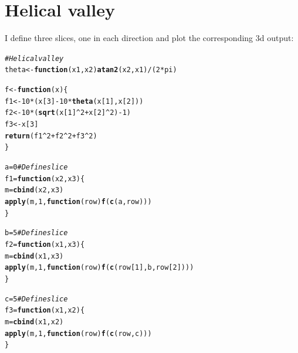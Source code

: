 \documentclass[11pt]{article}\usepackage[]{graphicx}\usepackage[]{color}
\makeatletter
\newcommand{\hlnum}[1]{\textcolor[rgb]{0.686,0.059,0.569}{#1}}%
\newcommand{\hlcom}[1]{\textcolor[rgb]{0.678,0.584,0.686}{\textit{#1}}}%
\newcommand{\hlopt}[1]{\textcolor[rgb]{0,0,0}{#1}}%
\newcommand{\hlstd}[1]{\textcolor[rgb]{0.345,0.345,0.345}{#1}}%
\newcommand{\hlkwa}[1]{\textcolor[rgb]{0.161,0.373,0.58}{\textbf{#1}}}%
\newcommand{\hlkwb}[1]{\textcolor[rgb]{0.69,0.353,0.396}{#1}}%
\newcommand{\hlkwc}[1]{\textcolor[rgb]{0.333,0.667,0.333}{#1}}%
\newcommand{\hlkwd}[1]{\textcolor[rgb]{0.737,0.353,0.396}{\textbf{#1}}}%
\newenvironment{kframe}{%
 \def\at@end@of@kframe{}%
 \ifinner\ifhmode%
  \def\at@end@of@kframe{\end{minipage}}%
  \begin{minipage}{\columnwidth}%
 \fi\fi%
 \def\FrameCommand##1{\hskip\@totalleftmargin \hskip-\fboxsep
 \colorbox{shadecolor}{##1}\hskip-\fboxsep
     \hskip-\linewidth \hskip-\@totalleftmargin \hskip\columnwidth}%
 \MakeFramed {\advance\hsize-\width
   \@totalleftmargin\z@ \linewidth\hsize
   \@setminipage}}%
 {\par\unskip\endMakeFramed%
 \at@end@of@kframe}
\newenvironment{knitrout}{}{} %
\makeatother
\begin{document}
\section{Helical valley}
I define three slices, one in each direction and plot the corresponding 3d output:
\begin{knitrout}
\color{fgcolor}\begin{kframe}
\begin{alltt}
\hlcom{# Helical valley}
\hlstd{theta} \hlkwb{<-} \hlkwa{function}\hlstd{(}\hlkwc{x1}\hlstd{,}\hlkwc{x2}\hlstd{)} \hlkwd{atan2}\hlstd{(x2, x1)}\hlopt{/}\hlstd{(}\hlnum{2}\hlopt{*}\hlstd{pi)}

\hlstd{f} \hlkwb{<-} \hlkwa{function}\hlstd{(}\hlkwc{x}\hlstd{) \{}
  \hlstd{f1} \hlkwb{<-} \hlnum{10}\hlopt{*}\hlstd{(x[}\hlnum{3}\hlstd{]} \hlopt{-} \hlnum{10}\hlopt{*}\hlkwd{theta}\hlstd{(x[}\hlnum{1}\hlstd{],x[}\hlnum{2}\hlstd{]))}
  \hlstd{f2} \hlkwb{<-} \hlnum{10}\hlopt{*}\hlstd{(}\hlkwd{sqrt}\hlstd{(x[}\hlnum{1}\hlstd{]}\hlopt{^}\hlnum{2}\hlopt{+}\hlstd{x[}\hlnum{2}\hlstd{]}\hlopt{^}\hlnum{2}\hlstd{)}\hlopt{-}\hlnum{1}\hlstd{)}
  \hlstd{f3} \hlkwb{<-} \hlstd{x[}\hlnum{3}\hlstd{]}
  \hlkwd{return}\hlstd{(f1}\hlopt{^}\hlnum{2}\hlopt{+}\hlstd{f2}\hlopt{^}\hlnum{2}\hlopt{+}\hlstd{f3}\hlopt{^}\hlnum{2}\hlstd{)}
\hlstd{\}}

\hlstd{a}\hlkwb{=}\hlnum{0} \hlcom{#Define slice}
\hlstd{f1} \hlkwb{=} \hlkwa{function}\hlstd{(}\hlkwc{x2}\hlstd{,}\hlkwc{x3}\hlstd{)\{}
  \hlstd{m}\hlkwb{=}\hlkwd{cbind}\hlstd{(x2,x3)}
  \hlkwd{apply}\hlstd{(m,}\hlnum{1}\hlstd{,}\hlkwa{function}\hlstd{(}\hlkwc{row}\hlstd{)} \hlkwd{f}\hlstd{(}\hlkwd{c}\hlstd{(a,row)))}
\hlstd{\}}

\hlstd{b}\hlkwb{=}\hlnum{5} \hlcom{#Define slice}
\hlstd{f2} \hlkwb{=} \hlkwa{function}\hlstd{(}\hlkwc{x1}\hlstd{,}\hlkwc{x3}\hlstd{)\{}
  \hlstd{m}\hlkwb{=}\hlkwd{cbind}\hlstd{(x1,x3)}
  \hlkwd{apply}\hlstd{(m,}\hlnum{1}\hlstd{,}\hlkwa{function}\hlstd{(}\hlkwc{row}\hlstd{)} \hlkwd{f}\hlstd{(}\hlkwd{c}\hlstd{(row[}\hlnum{1}\hlstd{],b,row[}\hlnum{2}\hlstd{])))}
\hlstd{\}}

\hlstd{c}\hlkwb{=}\hlnum{5} \hlcom{#Define slice}
\hlstd{f3} \hlkwb{=} \hlkwa{function}\hlstd{(}\hlkwc{x1}\hlstd{,}\hlkwc{x2}\hlstd{)\{}
  \hlstd{m}\hlkwb{=}\hlkwd{cbind}\hlstd{(x1,x2)}
  \hlkwd{apply}\hlstd{(m,}\hlnum{1}\hlstd{,}\hlkwa{function}\hlstd{(}\hlkwc{row}\hlstd{)} \hlkwd{f}\hlstd{(}\hlkwd{c}\hlstd{(row,c)))}
\hlstd{\}}
\end{alltt}
\end{kframe}
\end{knitrout}
\end{document}
